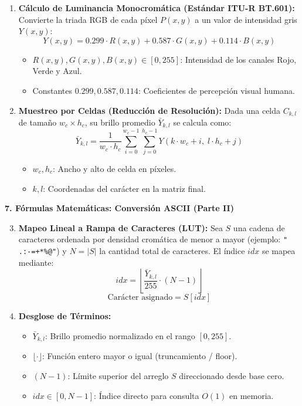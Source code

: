 \documentclass[12pt]{article}
\begin{document}
\begin{enumerate}
    \item \textbf{Cálculo de Luminancia Monocromática (Estándar ITU-R BT.601):}
    Convierte la triada RGB de cada píxel $P(x,y)$ a un valor de intensidad gris $Y(x,y)$:
    $$Y(x,y) = 0.299 \cdot R(x,y) + 0.587 \cdot G(x,y) + 0.114 \cdot B(x,y)$$
    \begin{itemize}
        \item $R(x,y), G(x,y), B(x,y) \in [0, 255]$: Intensidad de los canales Rojo, Verde y Azul.
        \item Constantes $0\text{.}299, 0\text{.}587, 0\text{.}114$: Coeficientes de percepción visual humana.
    \end{itemize}

    \item \textbf{Muestreo por Celdas (Reducción de Resolución):}
    Dada una celda $C_{k,l}$ de tamaño $w_c \times h_c$, su brillo promedio $\bar{Y}_{k,l}$ se calcula como:
    $$\bar{Y}_{k,l} = \frac{1}{w_c \cdot h_c} \sum_{i=0}^{w_c-1} \sum_{j=0}^{h_c-1} Y(k \cdot w_c + i, \; l \cdot h_c + j)$$
    \begin{itemize}
        \item $w_c, h_c$: Ancho y alto de celda en píxeles.
        \item $k, l$: Coordenadas del carácter en la matriz final.
    \end{itemize}
\end{enumerate}

\newpage

{\Huge \bfseries 7. Fórmulas Matemáticas: Conversión ASCII (Parte II)}\\[0.8cm]

\Large
\begin{enumerate}
    \setcounter{enumii}{2}
    \item \textbf{Mapeo Lineal a Rampa de Caracteres (LUT):}
    Sea $S$ una cadena de caracteres ordenada por densidad cromática de menor a mayor (ejemplo: \texttt{" .:-=+*\%@"}) y $N = |S|$ la cantidad total de caracteres. El índice $idx$ se mapea mediante:
    $$idx = \left\lfloor \frac{\bar{Y}_{k,l}}{255} \cdot (N - 1) \right\rfloor$$
    $$\text{Carácter asignado} = S[idx]$$

    \item \textbf{Desglose de Términos:}
    \begin{itemize}
        \item $\bar{Y}_{k,l}$: Brillo promedio normalizado en el rango $[0, 255]$.
        \item $\lfloor \cdot \rfloor$: Función entero mayor o igual (truncamiento / floor).
        \item $(N - 1)$: Límite superior del arreglo $S$ direccionado desde base cero.
        \item $idx \in [0, N-1]$: Índice directo para consulta $O(1)$ en memoria.
    \end{itemize}
\end{enumerate}
\end{document}
